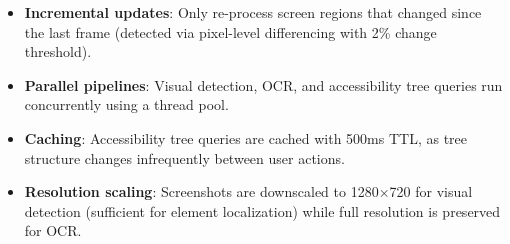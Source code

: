 \begin{itemize}[leftmargin=*]
    \item \textbf{Incremental updates}: Only re-process screen regions that changed since the last frame (detected via pixel-level differencing with 2\% change threshold).
    \item \textbf{Parallel pipelines}: Visual detection, OCR, and accessibility tree queries run concurrently using a thread pool.
    \item \textbf{Caching}: Accessibility tree queries are cached with 500ms TTL, as tree structure changes infrequently between user actions.
    \item \textbf{Resolution scaling}: Screenshots are downscaled to 1280$\times$720 for visual detection (sufficient for element localization) while full resolution is preserved for OCR.
\end{itemize}


